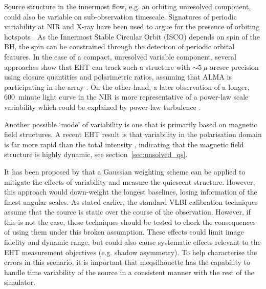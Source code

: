 Source structure in the innermost flow, e.g. an orbiting unresolved component, could also be variable on sub-observation timescale. Signatures of periodic variability at NIR and X-ray \citep{Genzel_2003,Belanger_2006} have been used to argue for the presence of orbiting hotspots \citep{Doeleman_2009b}. As the Innermost Stable Circular Orbit (ISCO) depends on spin of the BH, the spin can be constrained through the detection of periodic orbital features. %
In the case of a compact, unresolved variable component, several approaches show that EHT can track such a structure with $\sim 5\ \mu$-arcsec precision using closure quantities and polarimetric ratios, assuming that ALMA is participating in the array \citep{Doeleman_2009b, Fish_2009b, Johnson_2014}. On the other hand, a later observation of a longer, 600~minute light curve in the NIR is more representative of a power-law scale variability  which could be explained by power-law turbulence \citep{Meyer_2008}. 

Another possible `mode' of variability is one that is primarily based on magnetic field structures. A recent EHT result is that variability in the polarisation domain is far more rapid than the total intensity \citep{Johnson_2015b}, indicating that the magnetic field structure is highly dynamic, see section~\ref{sec:unsolved_qs}. 


It has been proposed by \citet{Lu_2016} that a Gaussian weighting scheme can be applied to mitigate the effects of variability and measure the quiescent structure. However, this approach would down-weight the longest baselines, losing information of the finest angular scales.
As stated earlier, the standard VLBI calibration techniques assume that the source is static over the course of the observation. However, if this is not the case, these techniques should be tested to check the consequences of using them under this broken assumption. These effects could limit image fidelity and dynamic range, but could also cause systematic effects relevant to the EHT measurement objectives (e.g. shadow asymmetry). To help characterise the errors in this scenario, it is important that {\sc meqsilhouette} has the capability to handle time variability of the source in a consistent manner with the rest of the simulator.

